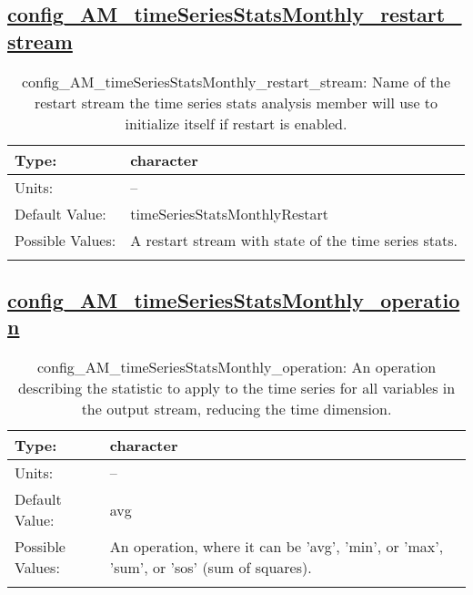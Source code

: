 \subsection[config\_AM\_timeSeriesStatsMonthly\_restart\_stream]{\hyperref[sec:nm_tab_AM_timeSeriesStatsMonthly]{config\_AM\_timeSeriesStatsMonthly\_restart\_stream}}
\label{subsec:nm_sec_config_AM_timeSeriesStatsMonthly_restart_stream}
\begin{center}
\begin{longtable}{| p{2.0in} || p{4.0in} |}
    \hline
    Type: & character \\
    \hline
    Units: & -- \\
    \hline
    Default Value: & timeSeriesStatsMonthlyRestart \\
    \hline
    Possible Values: & A restart stream with state of the time series stats. \\
    \hline
    \caption{config\_AM\_timeSeriesStatsMonthly\_restart\_stream: Name of the restart stream the time series stats analysis member will use to initialize itself if restart is enabled.}
\end{longtable}
\end{center}
\subsection[config\_AM\_timeSeriesStatsMonthly\_operation]{\hyperref[sec:nm_tab_AM_timeSeriesStatsMonthly]{config\_AM\_timeSeriesStatsMonthly\_operation}}
\label{subsec:nm_sec_config_AM_timeSeriesStatsMonthly_operation}
\begin{center}
\begin{longtable}{| p{2.0in} || p{4.0in} |}
    \hline
    Type: & character \\
    \hline
    Units: & -- \\
    \hline
    Default Value: & avg \\
    \hline
    Possible Values: & An operation, where it can be 'avg', 'min', or 'max', 'sum', or 'sos' (sum of squares). \\
    \hline
    \caption{config\_AM\_timeSeriesStatsMonthly\_operation: An operation describing the statistic to apply to the time series for all variables in the output stream, reducing the time dimension.}
\end{longtable}
\end{center}
